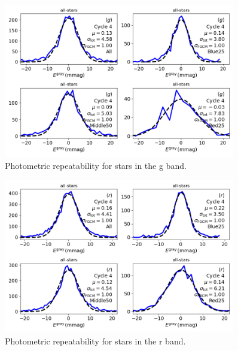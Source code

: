 \begin{figure}
  \begin{center}
    \includegraphics[width=0.9\textwidth]{photometric_calibration_figures/repeatability_g.png}
  \end{center}
  \caption{Photometric repeatability for stars in the g band.}
\end{figure}

\begin{figure}
  \begin{center}
    \includegraphics[width=0.9\textwidth]{photometric_calibration_figures/repeatability_r.png}
  \end{center}
  \caption{Photometric repeatability for stars in the r band.}
\end{figure}


